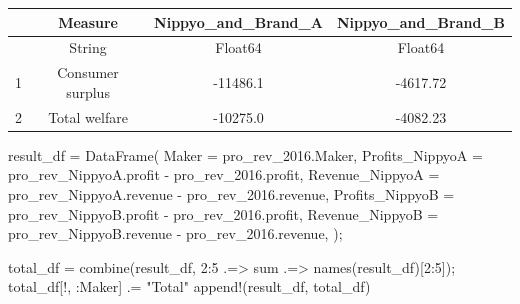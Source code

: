 \documentclass[
  letterpaper,
  DIV=11,
  numbers=noendperiod]{scrreprt}
\newenvironment{Shaded}{\begin{snugshade}}{\end{snugshade}}
\newcommand{\FloatTok}[1]{\textcolor[rgb]{0.68,0.00,0.00}{#1}}
\newcommand{\FunctionTok}[1]{\textcolor[rgb]{0.28,0.35,0.67}{#1}}
\newcommand{\NormalTok}[1]{\textcolor[rgb]{0.00,0.23,0.31}{#1}}
\newcommand{\OperatorTok}[1]{\textcolor[rgb]{0.37,0.37,0.37}{#1}}
\newcommand{\StringTok}[1]{\textcolor[rgb]{0.13,0.47,0.30}{#1}}
\begin{document}
\begin{tabular}{r|ccc}
    & Measure & Nippyo\_and\_Brand\_A & Nippyo\_and\_Brand\_B\\
    \hline
    & String & Float64 & Float64\\
    \hline
    1 & Consumer surplus & -11486.1 & -4617.72 \\
    2 & Total welfare & -10275.0 & -4082.23 \\
\end{tabular}

\begin{Shaded}
\begin{Highlighting}[]
\NormalTok{result\_df }\OperatorTok{=} \FunctionTok{DataFrame}\NormalTok{(}
\NormalTok{    Maker }\OperatorTok{=}\NormalTok{ pro\_rev\_2016.Maker,}
\NormalTok{    Profits\_NippyoA }\OperatorTok{=}\NormalTok{ pro\_rev\_NippyoA.profit }\OperatorTok{{-}}\NormalTok{ pro\_rev\_2016.profit,}
\NormalTok{    Revenue\_NippyoA }\OperatorTok{=}\NormalTok{ pro\_rev\_NippyoA.revenue }\OperatorTok{{-}}\NormalTok{ pro\_rev\_2016.revenue,}
\NormalTok{    Profits\_NippyoB }\OperatorTok{=}\NormalTok{ pro\_rev\_NippyoB.profit }\OperatorTok{{-}}\NormalTok{ pro\_rev\_2016.profit,}
\NormalTok{    Revenue\_NippyoB }\OperatorTok{=}\NormalTok{ pro\_rev\_NippyoB.revenue }\OperatorTok{{-}}\NormalTok{ pro\_rev\_2016.revenue,}
\NormalTok{);}

\NormalTok{total\_df }\OperatorTok{=} \FunctionTok{combine}\NormalTok{(result\_df, }\FloatTok{2}\OperatorTok{:}\FloatTok{5} \OperatorTok{.=\textgreater{}}\NormalTok{ sum }\OperatorTok{.=\textgreater{}} \FunctionTok{names}\NormalTok{(result\_df)[}\FloatTok{2}\OperatorTok{:}\FloatTok{5}\NormalTok{]);}
\NormalTok{total\_df[!, }\OperatorTok{:}\NormalTok{Maker] }\OperatorTok{.=} \StringTok{"Total"}
\FunctionTok{append!}\NormalTok{(result\_df, total\_df)}
\end{Highlighting}
\end{Shaded}
\end{document}
